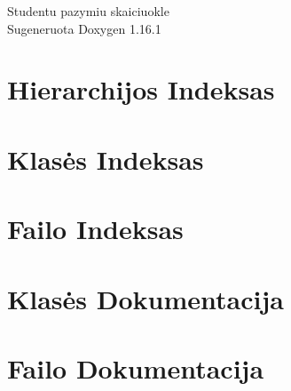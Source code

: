 \documentclass[twoside]{book}
\newcommand{\+}{\discretionary{\mbox{\scriptsize$\hookleftarrow$}}{}{}}
\newcommand{\clearemptydoublepage}{%
    \newpage{\pagestyle{empty}\cleardoublepage}%
  }
\begin{document}
  \raggedbottom
    \hypersetup{pageanchor=false,
                bookmarksnumbered=true,
                pdfencoding=unicode
               }
  \begin{titlepage}
  \vspace*{7cm}
  \begin{center}%
  {\Large Studentu pazymiu skaiciuokle}\\
  \vspace*{1cm}
  {\large Sugeneruota Doxygen 1.16.1}\\
  \end{center}
  \end{titlepage}
  \clearemptydoublepage
  \tableofcontents
  \clearemptydoublepage
  \hypersetup{pageanchor=true}
\chapter{Hierarchijos Indeksas}

\chapter{Klasės Indeksas}

\chapter{Failo Indeksas}

\chapter{Klasės Dokumentacija}


\chapter{Failo Dokumentacija}













  \backmatter
  \newpage
  \clearemptydoublepage
  \printindex
\end{document}
